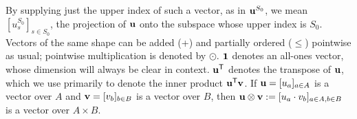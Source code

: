\documentclass[twoside]{article}
\begin{document}
By supplying just the upper index of such a vector, as in $\mathbf{u}^{S_0}$,
we mean $[u^{S_0}_s]_{s \in {S_0}}$, the projection of $\mathbf{u}$ onto the subspace whose upper index is $S_0$. 
Vectors of the same shape 
 can be added (+) and partially ordered ($\le$) pointwise as usual; pointwise multiplication is denoted by $\odot$.  
$\mathbf{1}$ denotes an all-ones vector, whose dimension will always be clear in context.
$\mathbf{u}^{\sf T}$ denotes the transpose of $\mathbf{u}$, which we use primarily to denote the inner product $\mathbf{u}^{\sf T} \mathbf{v}$.
If $\mathbf{u} = [u_a]_{a \in A}$ is a vector over $A$ and $\mathbf{v} = [v_b]_{b \in B}$ is a vector over $B$, then $\mathbf{u} \mathbin{\otimes} \mathbf{v} := [ u_a \cdot v_b ]_{a \in A, b \in B}$ is a vector over $A \times B$.

\end{document}
